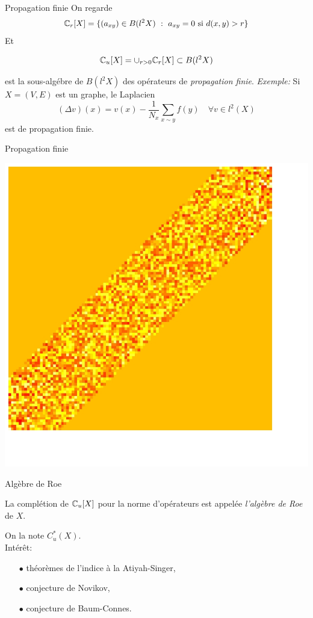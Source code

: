 \begin{frame}{Propagation finie}
On regarde \[\mathbb C_r [X] = \{ (a_{xy})\in B(l^2 X) \ : \ a_{xy }=0 \text{ si } d(x,y)> r\}  \]
Et 
\begin{block}{}
\[\mathbb C_u[X] = \cup_{r>0} \mathbb C_r[X] \subset B(l^2 X) \]
\end{block}
est la sous-alg\'ebre de $B(l^2 X)$ des op\'erateurs de \textit{propagation finie}.
\vfill
\textit{Exemple:} Si $X=(V,E)$ est un graphe, le Laplacien
\[(\Delta v)(x) = v(x) - \frac{1}{N_x}\sum_{x\sim y} f(y) \quad \forall v\in l^2(X)\]
est de propagation finie.
\end{frame}

\begin{frame}{Propagation finie}
\begin{center}
\vfill
\includegraphics[width=0.8\linewidth]{finite_propagation}
\vfill
\end{center}
\end{frame}

\begin{frame}{Alg\`ebre de Roe}
\begin{definition}
La compl\'etion de $\mathbb C_u[X]$ pour la norme d'op\'erateurs est appel\'ee \textit{l'alg\`ebre de Roe} de $X$. 
\end{definition}
\vfill
On la note $C^*_u(X)$.\\
\vfill
Int\'er\^{e}t: 
\begin{itemize}
\item[$\bullet$] th\'eor\`emes de l'indice \`a la Atiyah-Singer,
\item[$\bullet$] conjecture de Novikov,
\item[$\bullet$] conjecture de Baum-Connes.
\end{itemize}
\end{frame}

